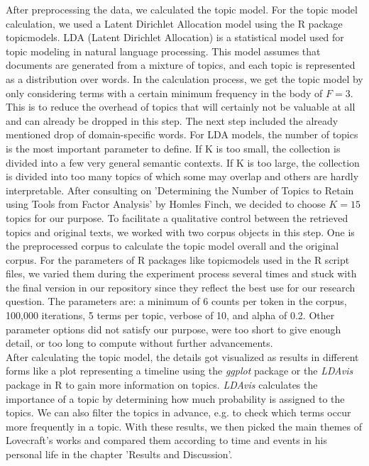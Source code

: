 After preprocessing the data, we calculated the topic model. For the topic model calculation, 
we used a Latent Dirichlet Allocation model using the R package topicmodels. LDA (Latent Dirichlet 
Allocation) is a statistical model used for topic modeling in natural language processing. This 
model assumes that documents are generated from a mixture of topics, and each topic is represented 
as a distribution over words. In the calculation process, we get the topic model by only 
considering terms with a certain minimum frequency in the body of $F=3$. This is to reduce the 
overhead of topics that will certainly not be valuable at all and can already be dropped in 
this step. The next step included the already mentioned drop of domain-specific words. For LDA 
models, the number of topics is the most important parameter to define. If K is too small, the 
collection is divided into a few very general semantic contexts. If K is too large, the collection 
is divided into too many topics of which some may overlap and others are hardly interpretable. 
After consulting on 'Determining the Number of Topics to Retain using Tools from Factor Analysis' 
by Homles Finch, we decided to choose $K=15$ topics for our purpose. To facilitate a qualitative 
control between the retrieved topics and original texts, we worked with two corpus objects in 
this step. One is the preprocessed corpus to calculate the topic model overall and the original 
corpus. For the parameters of R packages like topicmodels used in the R script files, we varied 
them during the experiment process several times and stuck with the final version in our repository 
since they reflect the best use for our research question. The parameters are: a minimum of 6 
counts per token in the corpus, 100,000 iterations, 5 terms per topic, verbose of 10, and alpha 
of 0.2. Other parameter options did not satisfy our purpose, were too short to give enough detail, 
or too long to compute without further advancements.\\

After calculating the topic model, the details got visualized as results in different forms 
like a plot representing a timeline using the \textit{ggplot} package or the \textit{LDAvis} package 
in R to gain more information on topics. \textit{LDAvis} calculates the importance of a topic by determining 
how much probability is assigned to the topics. We can also filter the topics in advance, e.g. 
to check which terms occur more frequently in a topic. With these results, we then picked the 
main themes of Lovecraft's works and compared them according to time and events in his personal 
life in the chapter 'Results and Discussion'.
